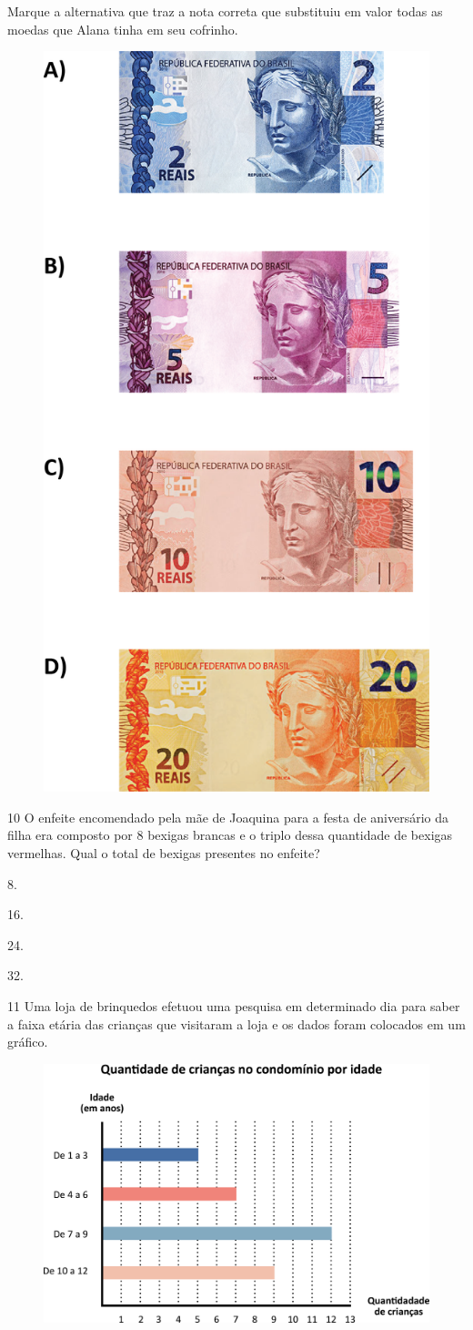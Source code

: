 \pagebreak
Marque a alternativa que traz a nota correta que substituiu em valor todas as moedas que Alana tinha em seu cofrinho.

\begin{figure}[htpb!]
\includegraphics[width=.45\textwidth]{./media/image117.png}
\end{figure}

\num{10} O enfeite encomendado pela mãe de Joaquina para a festa de aniversário da filha era composto por 8 bexigas brancas e o triplo dessa quantidade de bexigas vermelhas. Qual o total de bexigas presentes no enfeite?

\begin{escolha}
\item
  8.
\item
  16.
\item
  24.
\item
  32.
\end{escolha}

\num{11} Uma loja de brinquedos efetuou uma pesquisa em determinado dia para saber a faixa etária das crianças que visitaram a loja e os dados foram
colocados em um gráfico.

\begin{figure}[htpb!]
\centering
\includegraphics[width=\textwidth]{./media/image118.png}
\end{figure}

